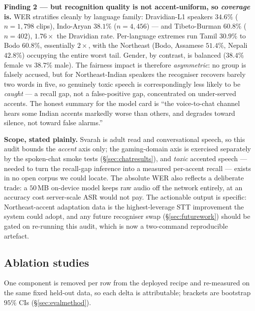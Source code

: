 \documentclass[11pt,a4paper]{article}
\begin{document}
\textbf{Finding 2 --- but recognition quality is not accent-uniform, so
\emph{coverage} is.} WER stratifies cleanly by language family: Dravidian-L1
speakers $34.6\%$ ($n{=}1{,}798$ clips), Indo-Aryan $38.1\%$ ($n{=}4{,}456$) ---
and Tibeto-Burman $60.8\%$ ($n{=}402$), $1.76\times$ the Dravidian rate.
Per-language extremes run Tamil $30.9\%$ to Bodo $60.8\%$, essentially
$2\times$, with the Northeast (Bodo, Assamese $51.4\%$, Nepali $42.8\%$)
occupying the entire worst tail. Gender, by contrast, is balanced ($38.4\%$
female vs $38.7\%$ male). The fairness impact is therefore \emph{asymmetric}:
no group is falsely accused, but for Northeast-Indian speakers the recogniser
recovers barely two words in five, so genuinely toxic speech is
correspondingly less likely to be \emph{caught} --- a recall gap, not a
false-positive gap, concentrated on under-served accents. The honest summary
for the model card is ``the voice-to-chat channel hears some Indian accents
markedly worse than others, and degrades toward silence, not toward false
alarms.''

\textbf{Scope, stated plainly.} Svarah is adult read and conversational
speech, so this audit bounds the \emph{accent} axis only; the gaming-domain
axis is exercised separately by the spoken-chat smoke tests
(\S\ref{sec:chatresults}), and \emph{toxic} accented speech --- needed to turn
the recall-gap inference into a measured per-accent recall --- exists in no
open corpus we could locate. The absolute WER also reflects a deliberate
trade: a $50$\,MB on-device model keeps raw audio off the network entirely,
at an accuracy cost server-scale ASR would not pay. The actionable output is
specific: Northeast-accent adaptation data is the highest-leverage STT
improvement the system could adopt, and any future recogniser swap
(\S\ref{sec:futurework}) should be gated on re-running this audit, which is
now a two-command reproducible artefact.

\subsection{Ablation studies}
\label{sec:ablations}
One component is removed per row from the deployed recipe and re-measured on the
same fixed held-out data, so each delta is attributable; brackets are bootstrap
$95\%$ CIs (\S\ref{sec:evalmethod}).
\end{document}
